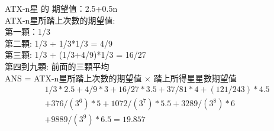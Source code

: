 \documentclass{article}
\begin{document}
\fontsize{15pt}{20pt}\selectfont

\begin{CJK}{UTF8}{bsmi} %
\noindent

ATX-n星 的 期望值：2.5+0.5n\\
ATX-n星所踏上次數的期望值:\\
第一顆：1/3\\
第二顆: 1/3 + 1/3*1/3 = 4/9\\
第三顆: 1/3 + (1/3+4/9)*1/3 = 16/27\\
第四到九顆: 前面的三顆平均\\

ANS = ATX-n星所踏上次數的期望值 $\times$ 踏上所得星星數期望值
\begin{align*}
&1/3*2.5 + 4/9*3 + 16/27*3.5 + 37/81*4 + (121/243)*4.5\\
& +376/(3^6)*5 +1072/(3^7)*5.5 + 3289/(3^8)*6 \\
& +9889/(3^9)*6.5 = 19.857
\end{align*}
\end{CJK} %
\end{document}
